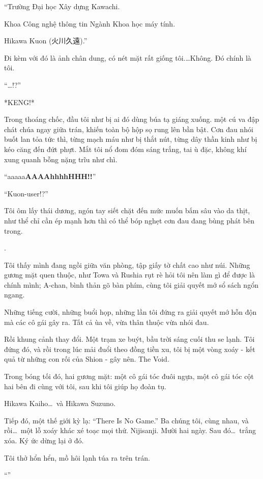 \documentclass[../main.tex]{subfiles}
\begin{document}
``Trường Đại học Xây dựng Kawachi.

Khoa Công nghệ thông tin   Ngành Khoa học máy tính.

Hikawa Kuon (火川久遠).''

Đi kèm với đó là ảnh chân dung, có nét mặt rất giống tôi.\dots Không. Đó chính là tôi.

``\dots!?''

*KENG!*

Trong thoáng chốc, đầu tôi như bị ai đó dùng búa tạ giáng xuống. một cú va đập chát chúa ngay giữa trán, khiến toàn bộ hộp sọ rung lên bần bật. Cơn đau nhói buốt lan tỏa tức thì, từng mạch máu như bị thắt nút, từng dây thần kinh như bị kéo căng đến đứt phựt. Mắt tôi nổ đom đóm sáng trắng, tai ù đặc, không khí xung quanh bỗng nặng trĩu như chì.

``aaaaa\textbf{AAAAhhhhHHH!!}''

``Kuon-user!?''

Tôi ôm lấy thái dương, ngón tay siết chặt đến mức muốn bấm sâu vào da thịt, như thể chỉ cần ép mạnh hơn thì có thể bóp nghẹt cơn đau đang bùng phát bên trong.

\hll.

Tôi thấy mình đang ngồi giữa văn phòng, tập giấy tờ chất cao như núi. Những gương mặt quen thuộc, như Towa và Rushia rụt rè hỏi tôi nên làm gì để được là chính mình; A-chan, bình thản gõ bàn phím, cùng tôi giải quyết mớ sổ sách ngổn ngang.

Những tiếng cười, những buổi họp, những lần tôi đứng ra giải quyết mớ hỗn độn mà các cô gái gây ra. Tất cả ùa về, vừa thân thuộc vừa nhói đau.

Rồi khung cảnh thay đổi. Một trạm xe buýt, bầu trời sáng cuối thu se lạnh. Tôi đứng đó, và rồi trong lúc mải đuổi theo đồng tiền xu, tôi bị một vòng xoáy - kết quả từ những con rối của Shion - gây nên. The Void.

Trong bóng tối đó, hai gương mặt: một cô gái tóc đuôi ngựa, một cô gái tóc cột hai bên đi cùng với tôi, sau khi tôi giúp họ đoàn tụ.

Hikawa Kaiho\dots\ và Hikawa Suzuno.

Tiếp đó, một thế giới kỳ lạ: ``There Is No Game.'' Ba chúng tôi, cùng nhau, và rồi\dots\ một lỗ xoáy khác xé toạc mọi thứ. Nijisanji. Mười hai ngày. Sau đó\dots\ trắng xóa. Ký ức dừng lại ở đó.

Tôi thở hổn hển, mồ hôi lạnh túa ra trên trán.

``''
\end{document}
